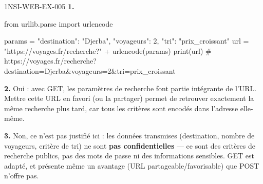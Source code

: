 \begin{corrige}{1NSI-WEB-EX-005}
\textbf{1.}
\begin{python}
from urllib.parse import urlencode

params = {"destination": "Djerba", "voyageurs": 2, "tri": "prix_croissant"}
url = "https://voyages.fr/recherche?" + urlencode(params)
print(url)
# https://voyages.fr/recherche?destination=Djerba&voyageurs=2&tri=prix_croissant
\end{python}

\textbf{2.} Oui : avec GET, les paramètres de recherche font partie intégrante de l'URL.
Mettre cette URL en favori (ou la partager) permet de retrouver exactement la même
recherche plus tard, car tous les critères sont encodés dans l'adresse elle-même.

\textbf{3.} Non, ce n'est pas justifié ici : les données transmises (destination,
nombre de voyageurs, critère de tri) ne sont \textbf{pas confidentielles} — ce sont des
critères de recherche publics, pas des mots de passe ni des informations sensibles. GET est
adapté, et présente même un avantage (URL partageable/favorisable) que POST n'offre pas.
\end{corrige}
